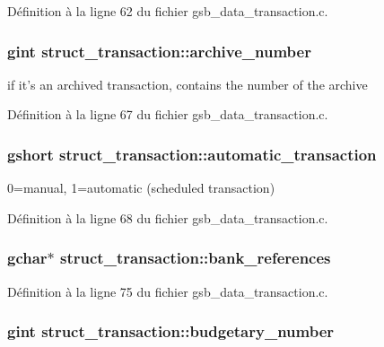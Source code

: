 Définition à la ligne 62 du fichier gsb\_\-data\_\-transaction.c.

\subsubsection[{archive\_\-number}]{\setlength{\rightskip}{0pt plus 5cm}gint {\bf struct\_\-transaction::archive\_\-number}}\label{structstruct__transaction_a13eb2fc6bdc8798d243e4d10284cf801}
if it's an archived transaction, contains the number of the archive 

Définition à la ligne 67 du fichier gsb\_\-data\_\-transaction.c.

\subsubsection[{automatic\_\-transaction}]{\setlength{\rightskip}{0pt plus 5cm}gshort {\bf struct\_\-transaction::automatic\_\-transaction}}\label{structstruct__transaction_a25d2d46973ae8beee3c37465c9b558f3}
0=manual, 1=automatic (scheduled transaction) 

Définition à la ligne 68 du fichier gsb\_\-data\_\-transaction.c.

\subsubsection[{bank\_\-references}]{\setlength{\rightskip}{0pt plus 5cm}gchar$\ast$ {\bf struct\_\-transaction::bank\_\-references}}\label{structstruct__transaction_a9e372b023d420bd88ee7cc71768d15e0}


Définition à la ligne 75 du fichier gsb\_\-data\_\-transaction.c.

\subsubsection[{budgetary\_\-number}]{\setlength{\rightskip}{0pt plus 5cm}gint {\bf struct\_\-transaction::budgetary\_\-number}}\label{structstruct__transaction_a61f036d52a9f50d3016f146e5fd80862}


